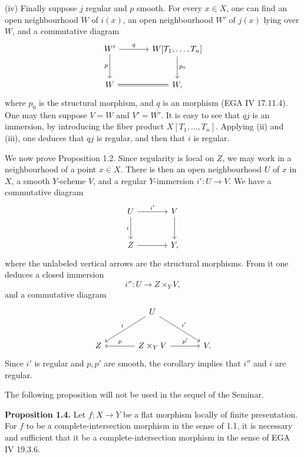 (iv) Finally suppose $j$ regular and $p$ smooth. For every $x\in X$, one can find an open neighbourhood $W$ of $i(x)$, an open neighbourhood $W'$ of $j(x)$ lying over $W$, and a commutative diagram
\[
\begin{tikzcd}[column sep=large,row sep=large]
W' \arrow[r,"q"] \arrow[d,"p"'] & W[T_1,\ldots,T_n] \arrow[d,"p_0"]\\
W \arrow[r,equal] & W,
\end{tikzcd}
\]
where $p_0$ is the structural morphism, and $q$ is an \etale morphism (EGA IV 17.11.4). One may then suppose $V=W$ and $V'=W'$. It is easy to see that $qj$ is an immersion, by introducing the fiber product $X[T_1,\ldots,T_n]$. Applying (ii) and (iii), one deduces that $qj$ is regular, and then that $i$ is regular.

We now prove Proposition 1.2. Since regularity is local on $Z$, we may work in a neighbourhood of a point $x\in X$. There is then an open neighbourhood $U$ of $x$ in $X$, a smooth $Y$-scheme $V$, and a regular $Y$-immersion $i':U\to V$. We have a commutative diagram
\[
\begin{tikzcd}[column sep=large,row sep=large]
U \arrow[r,"i'"] \arrow[d,"i"'] & V \arrow[d]\\
Z \arrow[r] & Y,
\end{tikzcd}
\]
where the unlabeled vertical arrows are the structural morphisms. From it one deduces a closed immersion
\[
i'':U\longrightarrow Z\times_Y V,
\]
and a commutative diagram
\[
\begin{tikzcd}[column sep=large,row sep=large]
& U \arrow[dl,"i"'] \arrow[dr,"i'"] &\\
Z & Z\times_Y V \arrow[l,"p"'] \arrow[r,"p'"] & V.
\end{tikzcd}
\]
Since $i'$ is regular and $p,p'$ are smooth, the corollary implies that $i''$ and $i$ are regular.

The following proposition will not be used in the sequel of the Seminar.

\textbf{Proposition 1.4.} Let $f:X\to Y$ be a flat morphism locally of finite presentation. For $f$ to be a complete-intersection morphism in the sense of 1.1, it is necessary and sufficient that it be a complete-intersection morphism in the sense of EGA IV 19.3.6.

